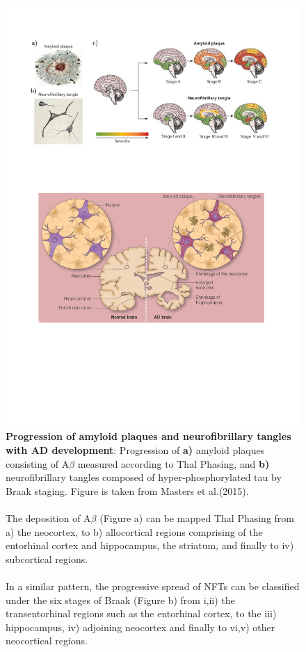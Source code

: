 \begin{figure}[!htp]
	\centering
	\includegraphics[page=1,trim={0 19cm 0cm 0cm},clip, scale = 0.8]{Figures/Introduction_Figures.pdf}
	\captionsetup{width=0.95\textwidth,singlelinecheck=off}
	\caption[Progression of amyloid plaques and neurofibrillary tangles with AD development]%
	{\textbf{Progression of amyloid plaques and neurofibrillary tangles with AD development}: Progression of \textbf{a)} amyloid plaques consisting of A$\beta$ measured according to Thal Phasing\cite{DR2002}, and \textbf{b)} neurofibrillary tangles composed of hyper-phosphorylated tau by Braak staging\cite{H1991}. Figure is taken from Masters et al.(2015)\cite{Masters2015}. 
		\\
		\\ 
		The deposition of A$\beta$ (Figure a) can be mapped Thal Phasing from a) the neocortex, to b) allocortical regions comprising of the entorhinal cortex and hippocampus, the striatum, and finally to iv) subcortical regions\cite{DR2002}. 
		\\
		\\
		In a similar pattern, the progressive spread of NFTs can be classified under the six stages of Braak (Figure b) from i,ii) the transentorhinal regions such as the entorhinal cortex, to the iii) hippocampus, iv) adjoining neocortex and finally to vi,v) other neocortical regions\cite{H1991}. 	
	}
	\label{fig:AD_development}
\end{figure}

